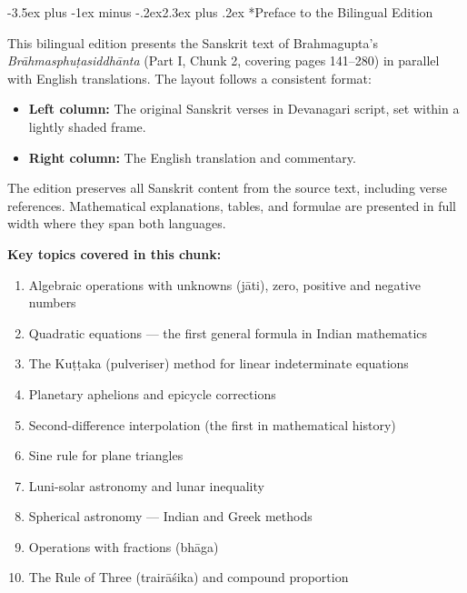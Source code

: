 \documentclass[11pt,a4paper]{article}
\makeatletter
\renewcommand{\section}{\@startsection {section}{1}{\z@}%
  {-3.5ex plus -1ex minus -.2ex}{2.3ex plus .2ex}%
  {\normalfont\Large\bfseries\color{sectioncolor}}}
\makeatother
\begin{document}
\tableofcontents
\newpage

\section*{Preface to the Bilingual Edition}

This bilingual edition presents the Sanskrit text of Brahmagupta's \textit{Brāhmasphuṭasiddhānta} (Part I, Chunk 2, covering pages 141--280) in parallel with English translations. The layout follows a consistent format:

\begin{itemize}
\item \textbf{Left column:} The original Sanskrit verses in Devanagari script, set within a lightly shaded frame.
\item \textbf{Right column:} The English translation and commentary.
\end{itemize}

The edition preserves all Sanskrit content from the source text, including verse references. Mathematical explanations, tables, and formulae are presented in full width where they span both languages.

\bigskip
\noindent\textbf{Key topics covered in this chunk:}
\begin{enumerate}
\item Algebraic operations with unknowns (jāti), zero, positive and negative numbers
\item Quadratic equations --- the first general formula in Indian mathematics
\item The Kuṭṭaka (pulveriser) method for linear indeterminate equations
\item Planetary aphelions and epicycle corrections
\item Second-difference interpolation (the first in mathematical history)
\item Sine rule for plane triangles
\item Luni-solar astronomy and lunar inequality
\item Spherical astronomy --- Indian and Greek methods
\item Operations with fractions (bhāga)
\item The Rule of Three (trairāśika) and compound proportion
\end{enumerate}
\end{document}
